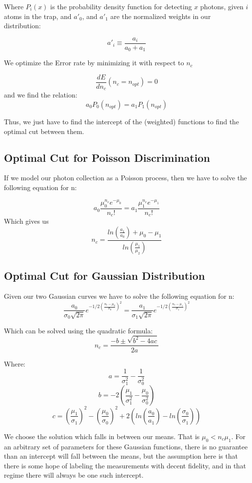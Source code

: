 \documentclass{article}
\begin{document}
Where $P_i(x)$ is the probability density function for detecting $x$ photons, given $i$ atoms in the trap, and $a'_0$, and $a'_1$ are the normalized weights in our distribution:

$$a'_i \equiv \frac{a_i}{a_0+a_1}$$

We optimize the Error rate by minimizing it with respect to $n_c$

\[\frac{dE}{dn_c}(n_c = n_{opt}) = 0\]
and we find the relation:
\[ a_0 P_0(n_{opt}) = a_1 P_1(n_{opt})\]

Thus, we just have to find the intercept of the (weighted) functions to find the optimal cut between them.

\subsection{Optimal Cut for Poisson Discrimination}
If we model our photon collection as a Poisson process, then we have to solve the following equation for n:

\[ a_0\frac{\mu_0^{n_c} e^{-\mu_0}}{n_c!} = a_1\frac{\mu_1^{n_c} e^{-\mu_1}}{n_c!} \]
Which gives us
\[n_c = \frac{ln(\frac{a_1}{a_0})+\mu_0-\mu_1}{ln(\frac{\mu_1}{\mu_2})}\]

\subsection{Optimal Cut for Gaussian Distribution}

Given our two Gaussian curves we have to solve the following equation for n:
\[\frac{a_0}{\sigma_0\sqrt{2\pi}} e^{-1/2(\frac{n_c-\mu_0}{\sigma_0})^2} = \frac{a_1}{\sigma_1\sqrt{2\pi}} e^{-1/2(\frac{n_c-\mu_1}{\sigma_1})^2} \]

Which can be solved using the quadratic formula:
\[n_c = \frac{-b\pm \sqrt{b^2-4ac}}{2a}\]
  
Where:
\[a = \frac{1}{\sigma_1^2} - \frac{1}{\sigma_0^2}\]
\[b = -2\left(\frac{\mu_1}{\sigma_1^2} -\frac{\mu_0}{\sigma_0^2}\right)\]
\[c = \left(\frac{\mu_1}{\sigma_1}\right)^2-\left(\frac{\mu_0}{\sigma_0}\right)^2+2\left(ln\left(\frac{a_0}{a_1}\right)-ln\left(\frac{\sigma_0}{\sigma_1}\right)\right)\]

We choose the solution which falls in between our means. That is $\mu_0 < n_c \mu_1$. For an arbitrary set of parameters for these Gaussian functions, there is no guarantee than an intercept will fall between the means, but the assumption here is that there is some hope of labeling the measurements with decent fidelity, and in that regime there will always be one such intercept.
\end{document}
